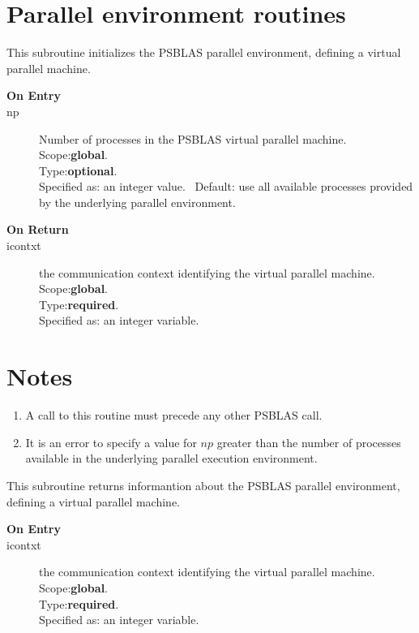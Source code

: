 
\section{Parallel environment routines}
\label{sec:parenv}



This subroutine initializes the PSBLAS parallel environment, defining
a virtual parallel machine.
\begin{description}
\item[\bf  On Entry ]
\item[np] Number of processes in the PSBLAS virtual parallel machine.\\
Scope:{\bf global}.\\
Type:{\bf optional}.\\
Specified as: an integer value. \
Default: use all available processes provided by the underlying
parallel environment.
\end{description}

\begin{description}
\item[\bf On Return]
\item[icontxt] the communication context identifying the virtual
  parallel machine.\\
Scope:{\bf global}.\\
Type:{\bf required}.\\
Specified as: an integer variable.
\end{description}


\section*{Notes}
\begin{enumerate}
\item A call to this routine must precede any other PSBLAS call. 
\item It is an error to specify a value for $np$ greater than the
  number of processes available in the underlying parallel execution
  environment. 
\end{enumerate}




This subroutine returns informantion about  the PSBLAS parallel environment, defining
a virtual parallel machine.
\begin{description}
\item[\bf  On Entry ]
\item[icontxt] the communication context identifying the virtual
  parallel machine.\\
Scope:{\bf global}.\\
Type:{\bf required}.\\
Specified as: an integer variable.
\end{description}

